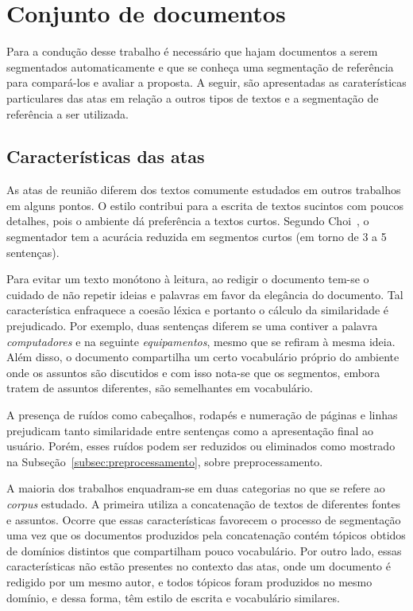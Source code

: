 
\section{Conjunto de documentos}
	\label{sec:conjutodedocumentos} 


	
Para a condução desse trabalho é necessário que hajam documentos a serem segmentados automaticamente e que se conheça uma segmentação de referência para compará-los e avaliar a proposta. A seguir, são apresentadas as caraterísticas particulares das atas em relação a outros tipos de textos e a segmentação de referência a ser utilizada.


\subsection{Características das atas}
	
As atas de reunião diferem dos textos comumente estudados em outros trabalhos em alguns pontos. O estilo contribui para a escrita de textos sucintos com poucos detalhes, pois o ambiente dá preferência a textos curtos. Segundo Choi~\cite{Choi2001-LSA}, o segmentador tem a acurácia reduzida em segmentos curtos (em torno de 3 a 5 sentenças). %
	
	Para evitar um texto monótono à leitura, ao redigir o documento tem-se o cuidado de não repetir ideias e palavras em favor da elegância do documento. Tal característica enfraquece a coesão léxica e portanto o cálculo da similaridade é prejudicado. Por exemplo, duas sentenças diferem se uma contiver a palavra \textit{computadores} e na seguinte \textit{equipamentos}, mesmo que se refiram à mesma ideia. Além disso, o documento compartilha um certo vocabulário próprio do ambiente onde os assuntos são discutidos e com isso nota-se que os segmentos, embora tratem de assuntos diferentes, são semelhantes em vocabulário.
	
A presença de ruídos como cabeçalhos, rodapés e numeração de páginas e linhas prejudicam tanto similaridade entre sentenças como a apresentação final ao usuário. Porém, esses ruídos podem ser reduzidos ou eliminados como mostrado na Subseção~\ref{subsec:preprocessamento}, sobre preprocessamento.



 
A maioria dos trabalhos enquadram-se em duas categorias no que se refere ao \textit{corpus} estudado.  
% 
%
A primeira utiliza a concatenação de textos de diferentes fontes e assuntos. 
Ocorre que essas características favorecem o processo de segmentação uma vez que os documentos produzidos pela concatenação contém tópicos obtidos de domínios distintos que compartilham pouco vocabulário. Por outro lado, essas características não estão presentes no contexto das atas, onde um documento é redigido por um mesmo autor, e todos tópicos foram produzidos no mesmo domínio, e dessa forma, têm estilo de escrita e vocabulário similares.


